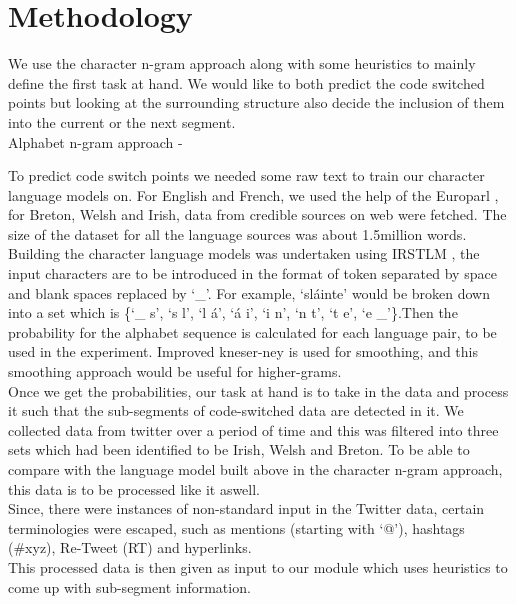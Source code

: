\documentclass[11pt]{article}
\begin{document}
\section{Methodology}
\label{sec:method}
We use the character n-gram approach along with some heuristics to mainly define the first task at hand. We would like to both predict the code switched points but looking at the surrounding structure also decide the inclusion of them into the current or the next segment. \\


Alphabet n-gram approach - 

To predict code switch points we needed some raw text to train our character language models on. For English and French, we used the help of the Europarl \cite{koehn2005europarl}, for Breton, Welsh and Irish, data from credible sources on web were fetched. The size of the dataset for all the language sources was about 1.5million words. \\
Building the character language models was undertaken using IRSTLM \cite{federico08a}, the input characters are to be introduced in the format of token separated by space and blank spaces replaced by `\_'. For example, `sl\'{a}inte' would be broken down into a set which is \{`\_ s', `s l', `l \'{a}', `\'{a} i', `i n', `n t', `t e', `e \_'\}.Then the probability for the alphabet sequence is calculated for each language pair, to be used in the experiment. Improved kneser-ney is used for smoothing, and this smoothing approach would be useful for higher-grams. \cite{kneser1995improved} \\

Once we get the probabilities, our task at hand is to take in the data and process it such that the  sub-segments of code-switched data are detected in it. We collected data from twitter over a period of time and this was filtered into three sets which had been identified to be Irish, Welsh and Breton. To be able to compare with the language model built above in the character n-gram approach, this data is to be processed like it aswell. \\

Since, there were instances of non-standard input in the Twitter data, certain terminologies were escaped, such as mentions (starting with ‘@’), hashtags (\#xyz), Re-Tweet (RT) and hyperlinks.\\
This processed data is then given as input to our module which uses heuristics to come up with sub-segment information. \\
\end{document}
